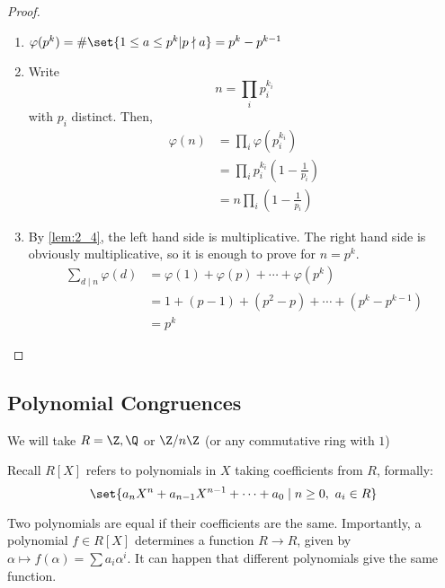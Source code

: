 \documentclass{article}
\begin{document}
\begin{proof}
    \leavevmode
    \begin{enumerate}[label=(\roman*)]
        \item $\varphi (p^k) = \# \set{ 1 \leq a \leq p^k | p \nmid a } = p^k - p^{k-1}$
        \item Write
            \begin{equation*}
                n = \prod_i p_i^{k_i}
            \end{equation*}
            with $p_i$ distinct. Then,
            \begin{align*}
                \varphi (n) &= \prod_i \varphi (p_i^{k_i}) \\%
                            &= \prod_i p_i^{k_i} \left(1 - \frac{1}{p_i}\right) \\
                            &= n \prod_i \left(1 - \frac{1}{p_i} \right)
            \end{align*}
        \item By \cref{lem:2_4}, the left hand side is multiplicative. The right hand side is obviously multiplicative, so it is enough to prove for $n = p^k$.
            \begin{align*}
                \sum_{d \mid n} \varphi(d) &= \varphi(1) + \varphi(p) + \dotsb + \varphi(p^k) \\
                                       &= 1 + (p - 1) + (p^2 - p) + \dotsb + (p^k - p^{k-1}) \\
                                       &= p^k
            \end{align*}
    \end{enumerate}
\end{proof}

\subsection{Polynomial Congruences}

We will take $R = \Z, \Q$ or $\Z/n\Z$ (or any commutative ring with $1$)

Recall $R[X]$ refers to polynomials in $X$ taking coefficients from $R$, formally:
\begin{equation*}
    \set{a_n X^n + a_{n-1} X^{n-1} + \dots + a_0 \mid n \geq 0, \ a_i \in R}
\end{equation*}

Two polynomials are equal if their coefficients are the same.
Importantly, a polynomial $f \in R[X]$ determines a function $R \to R$, given by $\alpha \mapsto f(\alpha) = \sum a_i \alpha^i$.
It can happen that different polynomials give the same function.
\end{document}
